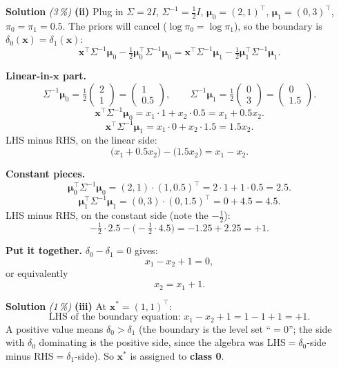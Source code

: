 \documentclass[11pt,a4paper]{article}
\newcommand{\subpoints}[1]{\textit{(#1\,\%)}}
\newcommand{\sol}{\noindent\textbf{Solution}}
\begin{document}
\medskip
\sol{} \subpoints{3} \textbf{(ii)} Plug in $\Sigma = 2 I$, $\Sigma^{-1} = \tfrac{1}{2}I$,
$\boldsymbol\mu_0 = (2,1)^\top$, $\boldsymbol\mu_1 = (0,3)^\top$, $\pi_0 = \pi_1 = 0.5$. The priors
will cancel ($\log\pi_0 = \log\pi_1$), so the boundary is $\delta_0(\mathbf x) = \delta_1(\mathbf x)$:
$$\mathbf x^\top\Sigma^{-1}\boldsymbol\mu_0
   - \tfrac{1}{2}\boldsymbol\mu_0^\top\Sigma^{-1}\boldsymbol\mu_0
   = \mathbf x^\top\Sigma^{-1}\boldsymbol\mu_1
   - \tfrac{1}{2}\boldsymbol\mu_1^\top\Sigma^{-1}\boldsymbol\mu_1.$$

\medskip
\textbf{Linear-in-$\mathbf x$ part.}
$$\Sigma^{-1}\boldsymbol\mu_0 = \tfrac{1}{2}\begin{pmatrix}2\\1\end{pmatrix} = \begin{pmatrix}1\\0.5\end{pmatrix},
\qquad
\Sigma^{-1}\boldsymbol\mu_1 = \tfrac{1}{2}\begin{pmatrix}0\\3\end{pmatrix} = \begin{pmatrix}0\\1.5\end{pmatrix}.$$
$$\mathbf x^\top\Sigma^{-1}\boldsymbol\mu_0 = x_1\cdot 1 + x_2\cdot 0.5 = x_1 + 0.5 x_2.$$
$$\mathbf x^\top\Sigma^{-1}\boldsymbol\mu_1 = x_1\cdot 0 + x_2\cdot 1.5 = 1.5 x_2.$$
LHS minus RHS, on the linear side:
$$\bigl(x_1 + 0.5 x_2\bigr) - \bigl(1.5 x_2\bigr) = x_1 - x_2.$$

\medskip
\textbf{Constant pieces.}
$$\boldsymbol\mu_0^\top\Sigma^{-1}\boldsymbol\mu_0
   = (2,1)\cdot(1, 0.5)^\top = 2\cdot 1 + 1\cdot 0.5 = 2.5.$$
$$\boldsymbol\mu_1^\top\Sigma^{-1}\boldsymbol\mu_1
   = (0,3)\cdot(0, 1.5)^\top = 0 + 4.5 = 4.5.$$
LHS minus RHS, on the constant side (note the $-\tfrac{1}{2}$):
$$-\tfrac{1}{2}\cdot 2.5 - \bigl(-\tfrac{1}{2}\cdot 4.5\bigr) = -1.25 + 2.25 = +1.$$

\medskip
\textbf{Put it together.} $\delta_0 - \delta_1 = 0$ gives:
$$x_1 - x_2 + 1 = 0,$$
or equivalently
$$\boxed{\;x_2 = x_1 + 1.\;}$$

\medskip
\sol{} \subpoints{1} \textbf{(iii)} At $\mathbf x^* = (1, 1)^\top$:
$$\text{LHS of the boundary equation: } x_1 - x_2 + 1 = 1 - 1 + 1 = +1.$$
A positive value means $\delta_0 > \delta_1$ (the boundary is the level set ``$=0$''; the side with
$\delta_0$ dominating is the positive side, since the algebra was LHS$=\delta_0$-side minus
RHS$=\delta_1$-side). So $\mathbf x^*$ is assigned to \textbf{class 0}.
\end{document}
